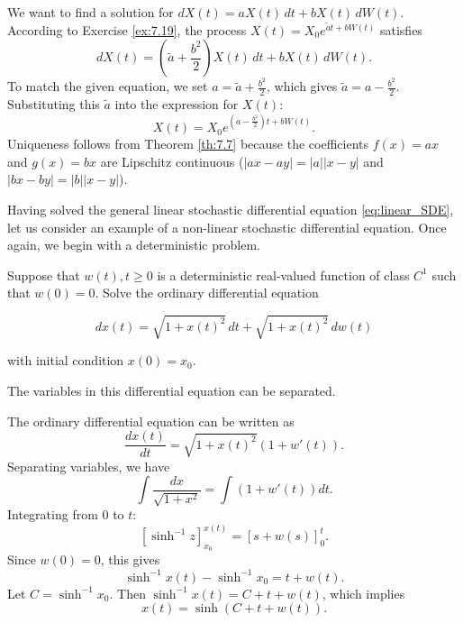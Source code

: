 \begin{Solution}
We want to find a solution for $dX(t) = a X(t) \, dt + b X(t) \, dW(t)$.
According to Exercise \ref{ex:7.19}, the process $X(t) = X_0 e^{\tilde{a} t + b W(t)}$ satisfies
\begin{equation*}
dX(t) = \left( \tilde{a} + \frac{b^2}{2} \right) X(t) \, dt + b X(t) \, dW(t).
\end{equation*}
To match the given equation, we set $a = \tilde{a} + \frac{b^2}{2}$, which gives $\tilde{a} = a - \frac{b^2}{2}$.
Substituting this $\tilde{a}$ into the expression for $X(t)$:
\begin{equation*}
X(t) = X_0 e^{\left( a - \frac{b^2}{2} \right) t + b W(t)}.
\end{equation*}
Uniqueness follows from Theorem \ref{th:7.7} because the coefficients $f(x) = ax$ and $g(x) = bx$ are Lipschitz continuous ($|ax - ay| = |a| |x - y|$ and $|bx - by| = |b| |x - y|$).
\end{Solution}

Having solved the general linear stochastic differential equation \eqref{eq:linear_SDE}, let us consider an example of a non-linear stochastic differential equation. Once again, we begin with a deterministic problem.

\begin{Exercise}
\label{ex:7.21}
Suppose that $w(t), t \geq 0$ is a deterministic real-valued function of class $C^1$ such that $w(0) = 0$. Solve the ordinary differential equation

\begin{equation}
dx(t) = \sqrt{1 + x(t)^2} \, dt + \sqrt{1 + x(t)^2} \, dw(t)
\end{equation}

with initial condition $x(0) = x_0$.

\begin{hint}
The variables in this differential equation can be separated.
\end{hint}
\end{Exercise}

\begin{Solution}
The ordinary differential equation can be written as
\begin{equation*}
\frac{dx(t)}{dt} = \sqrt{1 + x(t)^2} (1 + w'(t)).
\end{equation*}
Separating variables, we have
\begin{equation*}
\int \frac{dx}{\sqrt{1 + x^2}} = \int (1 + w'(t)) dt.
\end{equation*}
Integrating from $0$ to $t$:
\begin{equation*}
\left[ \sinh^{-1} z \right]_{x_0}^{x(t)} = \left[ s + w(s) \right]_0^t.
\end{equation*}
Since $w(0) = 0$, this gives
\begin{equation*}
\sinh^{-1} x(t) - \sinh^{-1} x_0 = t + w(t).
\end{equation*}
Let $C = \sinh^{-1} x_0$. Then $\sinh^{-1} x(t) = C + t + w(t)$, which implies
\begin{equation*}
x(t) = \sinh(C + t + w(t)).
\end{equation*}
\end{Solution}

